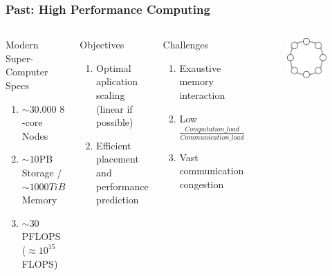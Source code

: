 \documentclass{beamer}
\begin{document}
\begin{frame}
\frametitle{Past: High Performance Computing}
\begin{columns}[c]


\begin{block}{Modern Super-Computer Specs}
\begin{enumerate}
\item $\sim30.000$ $8$-core Nodes\\
\item $\sim10$PB Storage / $\sim1000TiB$ Memory\\
\item $\sim30$PFLOPS ($\approx 10^{15}$FLOPS)
\end{enumerate}
\end{block}

\begin{block}{Objectives}
\begin{enumerate}
\item Optimal aplication scaling (linear if possible)
\item Efficient placement and performance prediction
\end{enumerate}
\end{block}

\begin{block}{Challenges}
\begin{enumerate}
\item Exaustive memory interaction
\item Low $\frac{Computation\_load}{Communication\_load}$
\item Vast communication congestion
\end{enumerate}
\end{block}


\begin{figure}
\includegraphics[width=.8\linewidth,right]{ring.jpg}
\end{figure}


\end{columns}
\end{frame}
\end{document}
